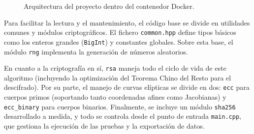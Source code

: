 \begin{figure}[htbp]
\begin{lrbox}{\arqbox}
%
\end{lrbox}%
\noindent\hspace*{\figpageshift}%
\resizebox{\textwidth}{!}{\usebox{\arqbox}}%
\caption{Arquitectura del proyecto dentro del contenedor Docker.}
\label{fig:arquitectura-docker}
\end{figure}

Para facilitar la lectura y el mantenimiento, el código base se divide en utilidades comunes y módulos criptográficos. El fichero \texttt{common.hpp} define tipos básicos como los enteros 
grandes (\texttt{BigInt}) y constantes globales. Sobre esta base, el módulo \texttt{rng} implementa la generación de números aleatorios. 

En cuanto a la criptografía en sí, \texttt{rsa} maneja todo el ciclo de vida de este algoritmo (incluyendo la optimización del Teorema Chino del Resto para el descifrado). Por su parte, 
el manejo de curvas elípticas se divide en dos: \texttt{ecc} para cuerpos primos (soportando tanto coordenadas afines como Jacobianas) y \texttt{ecc\_binary} para cuerpos binarios. 
Finalmente, se incluye un módulo \texttt{sha256} desarrollado a medida, y todo se controla desde el punto de entrada \texttt{main.cpp}, que gestiona la ejecución de las pruebas y la 
exportación de datos.


